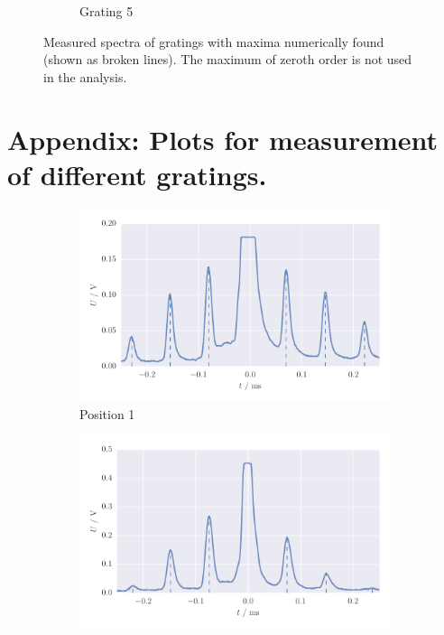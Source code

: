 \begin{figure}[H]
\begin{subfigure}[b]{\mpltw}
        \caption{Grating 5}
        \label{fig:gratings_maxi1}
    \end{subfigure}
    \caption{
        Measured spectra of gratings with maxima numerically found (shown as broken 
            lines). The maximum of zeroth order is not used in the analysis. 
        }
    \label{fig:gratings_maxima}
\end{figure}
\FloatBarrier

\section{Appendix: Plots for measurement of different gratings.}
\label{sec:appendix_aperture_plots}
\begin{figure}[H]
    \centering
    \begin{subfigure}[b]{\mpltw}
        \includegraphics[width=\textwidth]{figures/aperture_1b}
        \caption{Position 1}
        \label{}
    \end{subfigure}
    \begin{subfigure}[b]{\mpltw}
        \includegraphics[width=\textwidth]{figures/aperture_2b}

\end{subfigure}
\end{figure}

